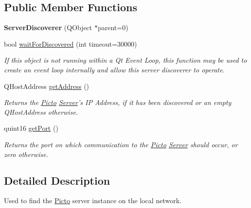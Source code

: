 \subsection*{Public Member Functions}
\begin{DoxyCompactItemize}
\item 
\hypertarget{struct_picto_1_1_server_discoverer_a10fd33867ea3ef09055dd9f0d6cd2bd3}{{\bfseries Server\-Discoverer} (Q\-Object $\ast$parent=0)}\label{struct_picto_1_1_server_discoverer_a10fd33867ea3ef09055dd9f0d6cd2bd3}

\item 
bool \hyperlink{struct_picto_1_1_server_discoverer_a3835900b0377f135c09fdf5673c74a73}{wait\-For\-Discovered} (int timeout=30000)
\begin{DoxyCompactList}\small\item\em If this object is not running within a Qt Event Loop, this function may be used to create an event loop internally and allow this server discoverer to operate. \end{DoxyCompactList}\item 
\hypertarget{struct_picto_1_1_server_discoverer_a014a51f2e39975b13b793d7d64699eda}{Q\-Host\-Address \hyperlink{struct_picto_1_1_server_discoverer_a014a51f2e39975b13b793d7d64699eda}{get\-Address} ()}\label{struct_picto_1_1_server_discoverer_a014a51f2e39975b13b793d7d64699eda}

\begin{DoxyCompactList}\small\item\em Returns the \hyperlink{namespace_picto}{Picto} \hyperlink{class_server}{Server}'s I\-P Address, if it has been discovered or an empty Q\-Host\-Address otherwise. \end{DoxyCompactList}\item 
\hypertarget{struct_picto_1_1_server_discoverer_a855ffdc379615648f27fda19322d162b}{quint16 \hyperlink{struct_picto_1_1_server_discoverer_a855ffdc379615648f27fda19322d162b}{get\-Port} ()}\label{struct_picto_1_1_server_discoverer_a855ffdc379615648f27fda19322d162b}

\begin{DoxyCompactList}\small\item\em Returns the port on which communication to the \hyperlink{namespace_picto}{Picto} \hyperlink{class_server}{Server} should occur, or zero otherwise. \end{DoxyCompactList}\end{DoxyCompactItemize}


\subsection{Detailed Description}
Used to find the \hyperlink{namespace_picto}{Picto} server instance on the local network. 

